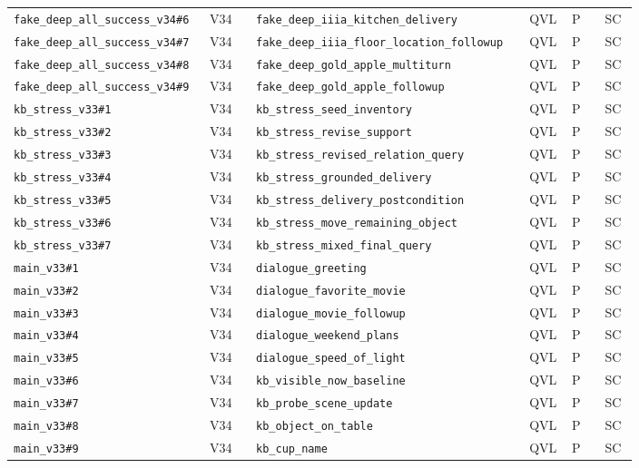 \begin{landscape}
\begin{longtable}{@{}p{0.205\linewidth}p{0.075\linewidth}p{0.35\linewidth}p{0.06\linewidth}p{0.055\linewidth}p{0.055\linewidth}@{}}
\nolinkurl{fake_deep_all_success_v34#6} & V34 & \nolinkurl{fake_deep_iiia_kitchen_delivery} & QVL & P & SC\\
\nolinkurl{fake_deep_all_success_v34#7} & V34 & \nolinkurl{fake_deep_iiia_floor_location_followup} & QVL & P & SC\\
\nolinkurl{fake_deep_all_success_v34#8} & V34 & \nolinkurl{fake_deep_gold_apple_multiturn} & QVL & P & SC\\
\nolinkurl{fake_deep_all_success_v34#9} & V34 & \nolinkurl{fake_deep_gold_apple_followup} & QVL & P & SC\\
\nolinkurl{kb_stress_v33#1} & V34 & \nolinkurl{kb_stress_seed_inventory} & QVL & P & SC\\
\nolinkurl{kb_stress_v33#2} & V34 & \nolinkurl{kb_stress_revise_support} & QVL & P & SC\\
\nolinkurl{kb_stress_v33#3} & V34 & \nolinkurl{kb_stress_revised_relation_query} & QVL & P & SC\\
\nolinkurl{kb_stress_v33#4} & V34 & \nolinkurl{kb_stress_grounded_delivery} & QVL & P & SC\\
\nolinkurl{kb_stress_v33#5} & V34 & \nolinkurl{kb_stress_delivery_postcondition} & QVL & P & SC\\
\nolinkurl{kb_stress_v33#6} & V34 & \nolinkurl{kb_stress_move_remaining_object} & QVL & P & SC\\
\nolinkurl{kb_stress_v33#7} & V34 & \nolinkurl{kb_stress_mixed_final_query} & QVL & P & SC\\
\nolinkurl{main_v33#1} & V34 & \nolinkurl{dialogue_greeting} & QVL & P & SC\\
\nolinkurl{main_v33#2} & V34 & \nolinkurl{dialogue_favorite_movie} & QVL & P & SC\\
\nolinkurl{main_v33#3} & V34 & \nolinkurl{dialogue_movie_followup} & QVL & P & SC\\
\nolinkurl{main_v33#4} & V34 & \nolinkurl{dialogue_weekend_plans} & QVL & P & SC\\
\nolinkurl{main_v33#5} & V34 & \nolinkurl{dialogue_speed_of_light} & QVL & P & SC\\
\nolinkurl{main_v33#6} & V34 & \nolinkurl{kb_visible_now_baseline} & QVL & P & SC\\
\nolinkurl{main_v33#7} & V34 & \nolinkurl{kb_probe_scene_update} & QVL & P & SC\\
\nolinkurl{main_v33#8} & V34 & \nolinkurl{kb_object_on_table} & QVL & P & SC\\
\nolinkurl{main_v33#9} & V34 & \nolinkurl{kb_cup_name} & QVL & P & SC\\

\end{longtable}
\end{landscape}
